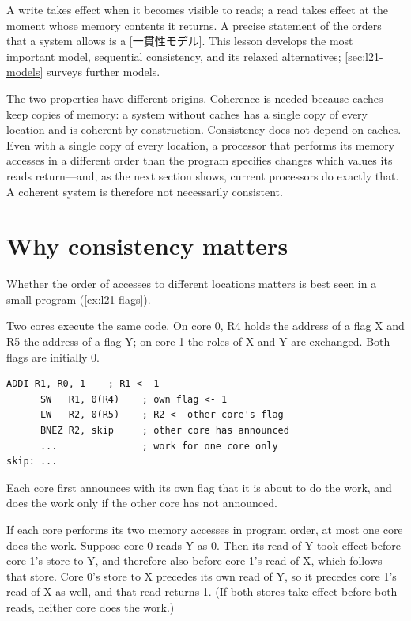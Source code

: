 \documentclass[../main.tex]{subfiles}
\begin{document}
A write takes effect when it becomes visible to reads; a read takes effect at
the moment whose memory contents it returns.  A precise statement of the
orders that a system allows is a [一貫性モデル].  This
lesson develops the most important model, sequential consistency, and its
relaxed alternatives; \cref{sec:l21-models} surveys further models.

The two properties have different origins.  Coherence is needed because
caches keep copies of memory: a system without caches has a single copy of
every location and is coherent by construction.  Consistency does not depend
on caches.  Even with a single copy of every location, a processor that
performs its memory accesses in a different order than the program specifies
changes which values its reads return---and, as the next section shows,
current processors do exactly that.  A coherent system is therefore not
necessarily consistent.

\section{Why consistency matters}
\label{sec:l21-matters}

Whether the order of accesses to different locations matters is best seen in
a small program (\cref{ex:l21-flags}).

\begin{example}
  \label{ex:l21-flags}
  Two cores execute the same code.  On core 0, R4 holds the address of a
  flag X and R5 the address of a flag Y; on core 1 the roles of X and Y are
  exchanged.  Both flags are initially 0.
  \begin{lstlisting}[language={[x86masm]Assembler}, numbers=none]
      ADDI R1, R0, 1    ; R1 <- 1
      SW   R1, 0(R4)    ; own flag <- 1
      LW   R2, 0(R5)    ; R2 <- other core's flag
      BNEZ R2, skip     ; other core has announced
      ...               ; work for one core only
skip: ...
\end{lstlisting}
  Each core first announces with its own flag that it is about to do the
  work, and does the work only if the other core has not announced.
\end{example}

If each core performs its two memory accesses in program order, at most one
core does the work.  Suppose core 0 reads Y as 0.  Then its read of Y took
effect before core 1's store to Y, and therefore also before core 1's read of
X, which follows that store.  Core 0's store to X precedes its own read of Y,
so it precedes core 1's read of X as well, and that read returns 1.  (If both
stores take effect before both reads, neither core does the
work.)
\end{document}
